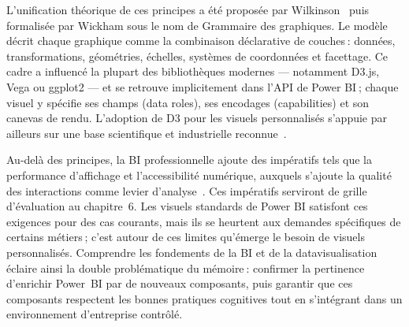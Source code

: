 L’unification théorique de ces principes a été proposée par Wilkinson~\parencite{Wilkinson2005} puis formalisée par Wickham sous le nom de Grammaire des graphiques. Le modèle décrit chaque graphique comme la combinaison déclarative de couches : données, transformations, géométries, échelles, systèmes de coordonnées et facettage. Ce cadre a influencé la plupart des bibliothèques modernes — notamment D3.js, Vega ou ggplot2 — et se retrouve implicitement dans l’API de Power BI ; chaque visuel y spécifie ses champs (data roles), ses encodages (capabilities) et son canevas de rendu. L’adoption de D3 pour les visuels personnalisés s’appuie par ailleurs sur une base scientifique et industrielle reconnue~\parencite{BostockOgievetskyHeer2011}.

Au-delà des principes, la BI professionnelle ajoute des impératifs tels que la performance d’affichage et l’accessibilité numérique, auxquels s’ajoute la qualité des interactions comme levier d’analyse~\parencite{HeerShneiderman2012}. Ces impératifs serviront de grille d’évaluation au chapitre~6. Les visuels standards de Power BI satisfont ces exigences pour des cas courants, mais ils se heurtent aux demandes spécifiques de certains métiers ; c’est autour de ces limites qu’émerge le besoin de visuels personnalisés. Comprendre les fondements de la BI et de la datavisualisation éclaire ainsi la double problématique du mémoire : confirmer la pertinence d’enrichir Power~BI par de nouveaux composants, puis garantir que ces composants respectent les bonnes pratiques cognitives tout en s’intégrant dans un environnement d’entreprise contrôlé.
